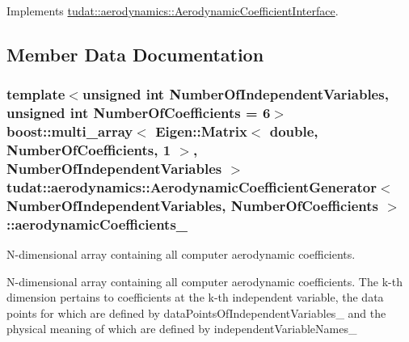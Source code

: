 Implements \hyperlink{classtudat_1_1aerodynamics_1_1AerodynamicCoefficientInterface_af68d685a47306b6525ea06bec6e91880}{tudat\+::aerodynamics\+::\+Aerodynamic\+Coefficient\+Interface}.



\subsection{Member Data Documentation}
\subsubsection[{\texorpdfstring{aerodynamic\+Coefficients\+\_\+}{aerodynamicCoefficients_}}]{\setlength{\rightskip}{0pt plus 5cm}template$<$unsigned int Number\+Of\+Independent\+Variables, unsigned int Number\+Of\+Coefficients = 6$>$ boost\+::multi\+\_\+array$<$ Eigen\+::\+Matrix$<$ double, Number\+Of\+Coefficients, 1 $>$, Number\+Of\+Independent\+Variables $>$ {\bf tudat\+::aerodynamics\+::\+Aerodynamic\+Coefficient\+Generator}$<$ Number\+Of\+Independent\+Variables, Number\+Of\+Coefficients $>$\+::aerodynamic\+Coefficients\+\_\+\hspace{0.3cm}{\ttfamily [protected]}}\hypertarget{classtudat_1_1aerodynamics_1_1AerodynamicCoefficientGenerator_ad6fc1e382d822715b80f9a1636e5ce53}{}\label{classtudat_1_1aerodynamics_1_1AerodynamicCoefficientGenerator_ad6fc1e382d822715b80f9a1636e5ce53}


N-\/dimensional array containing all computer aerodynamic coefficients. 

N-\/dimensional array containing all computer aerodynamic coefficients. The k-\/th dimension pertains to coefficients at the k-\/th independent variable, the data points for which are defined by data\+Points\+Of\+Independent\+Variables\+\_\+ and the physical meaning of which are defined by independent\+Variable\+Names\+\_\+ 
